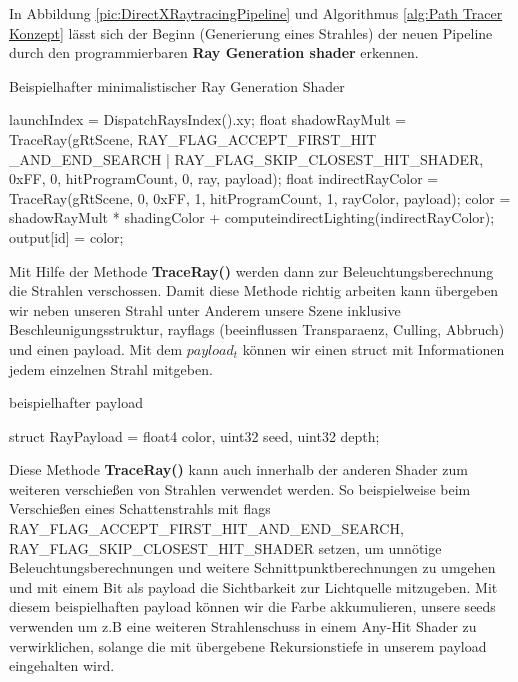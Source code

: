 In Abbildung \ref{pic:DirectXRaytracingPipeline} und  Algorithmus \ref{alg:Path Tracer Konzept} lässt sich
der Beginn (Generierung eines Strahles) der neuen Pipeline durch den programmierbaren
\textbf{Ray Generation shader} erkennen.

\begin{tcolorbox}
\begin{algorithm}[H]
    \caption{Beispielhafter minimalistischer Ray Generation Shader}
    \begin{algorithmic}[1]
        \State launchIndex = DispatchRaysIndex().xy;
            \State float shadowRayMult = TraceRay(gRtScene,
            RAY\_FLAG\_ACCEPT\_FIRST\_HIT \_AND\_END\_SEARCH |
            RAY\_FLAG\_SKIP\_CLOSEST\_HIT\_SHADER,
            0xFF, 0, hitProgramCount, 0, ray, payload);
            \State float indirectRayColor = TraceRay(gRtScene, 0, 0xFF, 1, hitProgramCount, 1, rayColor, payload);
            \State color = shadowRayMult * shadingColor + computeindirectLighting(indirectRayColor);
        \EndFor
        \State output[id] = color;
    \end{algorithmic}
    \label{alg:Ray Gen}
\end{algorithm}
\end{tcolorbox}

Mit Hilfe der Methode \textbf{TraceRay()} werden dann zur Beleuchtungsberechnung 
die Strahlen verschossen. Damit diese Methode richtig arbeiten kann übergeben wir neben unseren Strahl 
unter Anderem  unsere Szene inklusive Beschleunigungsstruktur, rayflags 
(beeinflussen Transparaenz, Culling, Abbruch)\cite{RayFlags} und einen payload.
Mit dem \textit{$payload_t$} können wir einen struct mit Informationen jedem einzelnen Strahl mitgeben.

\begin{tcolorbox}
\begin{algorithm}[H]
    \caption{beispielhafter payload}
    \begin{algorithmic}[1]
        \State struct RayPayload = {float4 color, uint32 seed, uint32 depth};        
        \end{algorithmic}
        \label{alg:payload}
\end{algorithm}
\end{tcolorbox}
    
Diese Methode \textbf{TraceRay()} kann auch innerhalb der anderen Shader zum weiteren verschießen
von Strahlen verwendet werden. So beispielweise beim Verschießen eines Schattenstrahls mit flags 
RAY\_FLAG\_ACCEPT\_FIRST\_HIT\_AND\_END\_SEARCH, \newline
RAY\_FLAG\_SKIP\_CLOSEST\_HIT\_SHADER setzen, um unnötige 
Beleuchtungsberechnungen und weitere Schnittpunktberechnungen zu umgehen und mit einem Bit als payload 
die Sichtbarkeit zur Lichtquelle mitzugeben.
Mit diesem beispielhaften payload können wir die Farbe akkumulieren, unsere  
seeds verwenden um z.B eine weiteren Strahlenschuss in einem Any-Hit Shader zu verwirklichen,  
solange die mit übergebene Rekursionstiefe in unserem payload eingehalten wird.  


